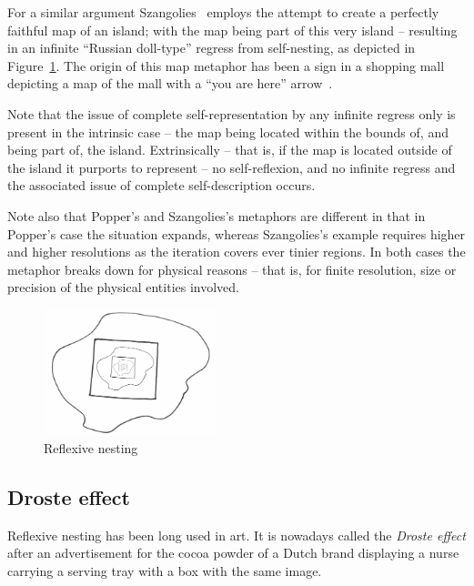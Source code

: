 For a similar argument Szangolies~\cite{Szangolies:2015:1611-8812:169}
employs the attempt to create a perfectly faithful map of an island; with the map being part of this very island --
resulting in an infinite ``Russian doll-type'' regress from self-nesting,
as depicted in Figure~\ref{2016-pu-book-chapter-eo-figure-refl_nesting}.
The origin of this map metaphor has been a sign in a  shopping mall depicting a map of the mall with a
``you are here'' arrow~\cite{Szangolies-email-2017}.

Note that the issue of complete self-representation by any infinite regress only is present in the intrinsic case -- the map being located within the bounds of,
and being part of, the island.
Extrinsically -- that is, if the map is located outside of the island it purports to represent --
no self-reflexion, and no infinite regress and the associated issue of complete self-description  occurs.

Note also that Popper's and  Szangolies's metaphors are different in that in Popper's case the situation expands,
whereas Szangolies's example requires higher and higher resolutions as the iteration covers ever tinier regions.
In both cases the metaphor breaks down for physical reasons -- that is, for finite resolution, size or precision of
the physical entities involved.

\begin{figure}
\begin{center}
\includegraphics[width=5cm,angle=10]{2016-pu-book-chapter-eo-figure-refl_nesting}
\end{center}
\caption{
Reflexive nesting
\label{2016-pu-book-chapter-eo-figure-refl_nesting}
}
\end{figure}

\subsection{Droste effect}

Reflexive nesting has been long used in art.
It is nowadays called the {\em Droste effect}
 after an advertisement for the cocoa powder  of a Dutch brand  displaying a nurse carrying a
serving tray with a box with the same image.

